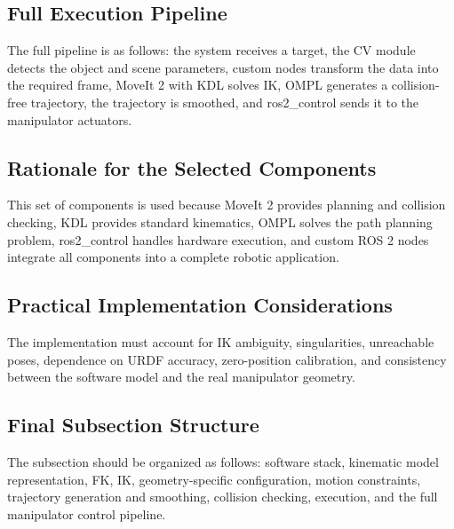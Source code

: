 \subsection*{Full Execution Pipeline}
The full pipeline is as follows: the system receives a target, the CV module detects the object and scene parameters, custom nodes transform the data into the required frame, MoveIt 2 with KDL solves IK, OMPL generates a collision-free trajectory, the trajectory is smoothed, and ros2\_control sends it to the manipulator actuators.

\subsection*{Rationale for the Selected Components}
This set of components is used because MoveIt 2 provides planning and collision checking, KDL provides standard kinematics, OMPL solves the path planning problem, ros2\_control handles hardware execution, and custom ROS 2 nodes integrate all components into a complete robotic application.

\subsection*{Practical Implementation Considerations}
The implementation must account for IK ambiguity, singularities, unreachable poses, dependence on URDF accuracy, zero-position calibration, and consistency between the software model and the real manipulator geometry.

\subsection*{Final Subsection Structure}
The subsection should be organized as follows: software stack, kinematic model representation, FK, IK, geometry-specific configuration, motion constraints, trajectory generation and smoothing, collision checking, execution, and the full manipulator control pipeline.
